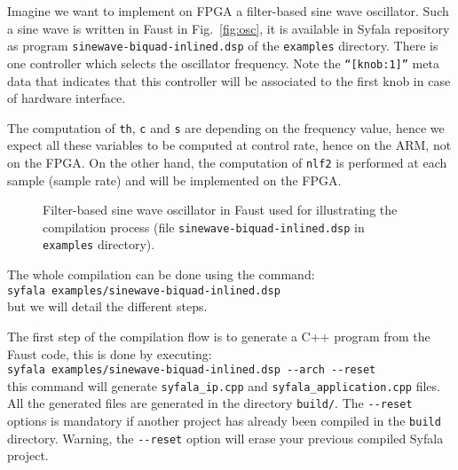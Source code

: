 \label{example}
\label{sec:example}
Imagine we want to implement on FPGA a filter-based sine wave oscillator. Such a sine wave is written in Faust in Fig.~\ref{fig:osc}, it is available in Syfala repository as program {\tt sinewave-biquad-inlined.dsp} of the {\tt examples} directory. There is one controller which selects the oscillator frequency. Note the {\tt ``[knob:1]''} meta data that indicates that this controller will be associated to the first knob in case of hardware interface.

The computation of {\tt th}, {\tt c} and {\tt s} are depending on the frequency value, hence we expect all these variables to be computed at control rate, hence on the ARM, not on the FPGA. On the other hand, the computation of {\tt nlf2} is performed at each sample (sample rate) and will be implemented on the FPGA.


\begin{figure}[ht]
  \begin{boxedminipage}{\columnwidth}
    \tiny
    
  \end{boxedminipage}
  \caption{Filter-based sine wave oscillator in Faust used for illustrating the compilation process (file {\tt sinewave-biquad-inlined.dsp} in {\tt examples} directory).}
  \label{fig:osc}
  \label{fig:biquad}
\end{figure}

The whole compilation can be done using the command:\\
{\tt syfala examples/sinewave-biquad-inlined.dsp}\\
but we will detail the different steps.

The first step of the compilation flow is to generate a C++ program from the Faust code, this is done by executing:\\
\verb#syfala examples/sinewave-biquad-inlined.dsp --arch --reset# \\
this command will generate {\tt syfala\_ip.cpp} and {\tt syfala\_application.cpp} files. All the generated files  are generated in the directory {\tt build/}. The \verb#--reset# options is mandatory if another project has already been compiled in the {\tt build} directory. Warning, the \verb#--reset# option will erase your previous compiled Syfala project.

